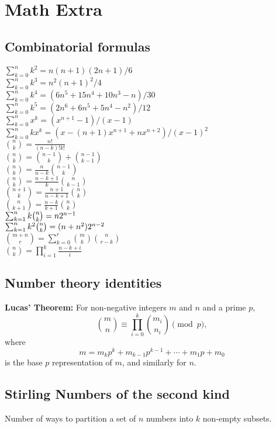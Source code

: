 \section{Math Extra}
\subsection{Combinatorial formulas}
 $\sum_{k=0}^{n}k^{2}=n(n+1)(2n+1)/6$\\
 $\sum_{k=0}^{n}k^{3}=n^{2}(n+1)^{2}/4$\\
 $\sum_{k=0}^{n}k^{4}=(6n^{5}+15n^{4}+10n^{3}-n)/30$\\
 $\sum_{k=0}^{n}k^{5}=(2n^{6}+6n^{5}+5n^{4}-n^{2})/12$\\
 $\sum_{k=0}^{n}x^{k}=(x^{n+1}-1)/(x-1)$\\
 $\sum_{k=0}^{n}kx^{k}=(x-(n+1)x^{n+1}+nx^{n+2})/(x-1)^{2}$\\
 ${n \choose k}=\frac{n!}{(n-k)!k!}$\\
 ${n \choose k}={n-1 \choose k}+{n-1 \choose k-1}$\\
 ${n \choose k}=\frac{n}{n-k}{n-1 \choose k}$\\
 ${n \choose k}=\frac{n-k+1}{k}{n \choose k-1}$\\
 ${n+1 \choose k}=\frac{n+1}{n-k+1}{n \choose k}$\\
 ${n \choose k+1}=\frac{n-k}{k+1}{n \choose k}$\\
 $\sum_{k=1}^{n}k\tbinom{n}{k}=n2^{n-1}$\\
 $\sum_{k=1}^{n}k^{2}\tbinom{n}{k}=(n+n^{2})2^{n-2}$\\
 ${m+n \choose r}=\sum_{k=0}^{r}{m \choose k}{n \choose r-k}$\\
 ${n \choose k}=\prod_{i=1}^{k}\frac{n-k+i}{i}$\\
\vspace{-\baselineskip}
\subsection{Number theory identities}
\textbf{Lucas' Theorem:} For non-negative integers $m$ and $n$ and a prime $p$,
\vspace{-\baselineskip}
$$\binom{m}{n}\equiv\prod_{i=0}^k\binom{m_i}{n_i}\pmod p,$$
where
\vspace{-\baselineskip}
$$m=m_kp^k+m_{k-1}p^{k-1}+\cdots +m_1p+m_0$$
is the base $p$ representation of $m$, and similarly for $n$.

\vspace{-\baselineskip}
\subsection{Stirling Numbers of the second kind}
Number of ways to partition a set of $n$ numbers into $k$ non-empty subsets.
\vspace{-\baselineskip}

